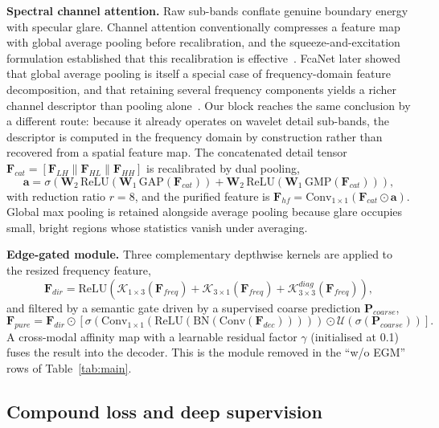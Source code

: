 \documentclass[journal]{IEEEtran}
\begin{document}
\textbf{Spectral channel attention.} Raw sub-bands conflate genuine boundary energy with specular glare. Channel attention conventionally compresses a feature map with global average pooling before recalibration, and the squeeze-and-excitation formulation established that this recalibration is effective~\cite{hu2018senet}. FcaNet later showed that global average pooling is itself a special case of frequency-domain feature decomposition, and that retaining several frequency components yields a richer channel descriptor than pooling alone~\cite{qin2021fcanet}. Our block reaches the same conclusion by a different route: because it already operates on wavelet detail sub-bands, the descriptor is computed in the frequency domain by construction rather than recovered from a spatial feature map. The concatenated detail tensor $\mathbf{F}_{cat}=[\mathbf{F}_{LH}\|\mathbf{F}_{HL}\|\mathbf{F}_{HH}]$ is recalibrated by dual pooling,
\begin{equation}
\mathbf{a}=\sigma\!\left(\mathbf{W}_2\,\mathrm{ReLU}(\mathbf{W}_1\,\mathrm{GAP}(\mathbf{F}_{cat}))+\mathbf{W}_2\,\mathrm{ReLU}(\mathbf{W}_1\,\mathrm{GMP}(\mathbf{F}_{cat}))\right),
\end{equation}
with reduction ratio $r=8$, and the purified feature is $\mathbf{F}_{hf}=\mathrm{Conv}_{1\times1}(\mathbf{F}_{cat}\odot\mathbf{a})$. Global max pooling is retained alongside average pooling because glare occupies small, bright regions whose statistics vanish under averaging.

\textbf{Edge-gated module.} Three complementary depthwise kernels are applied to the resized frequency feature,
\begin{equation}
\mathbf{F}_{dir}=\mathrm{ReLU}\!\left(\mathcal{K}_{1\times3}(\mathbf{F}_{freq})+\mathcal{K}_{3\times1}(\mathbf{F}_{freq})+\mathcal{K}_{3\times3}^{diag}(\mathbf{F}_{freq})\right),
\end{equation}
and filtered by a semantic gate driven by a supervised coarse prediction $\mathbf{P}_{coarse}$,
\begin{equation}
\mathbf{F}_{pure}=\mathbf{F}_{dir}\odot\left[\sigma(\mathrm{Conv}_{1\times1}(\mathrm{ReLU}(\mathrm{BN}(\mathrm{Conv}(\mathbf{F}_{dec}))))) \odot \mathcal{U}(\sigma(\mathbf{P}_{coarse}))\right].
\end{equation}
A cross-modal affinity map with a learnable residual factor $\gamma$ (initialised at 0.1) fuses the result into the decoder. This is the module removed in the ``w/o EGM'' rows of Table~\ref{tab:main}.

\subsection{Compound loss and deep supervision}
\end{document}
